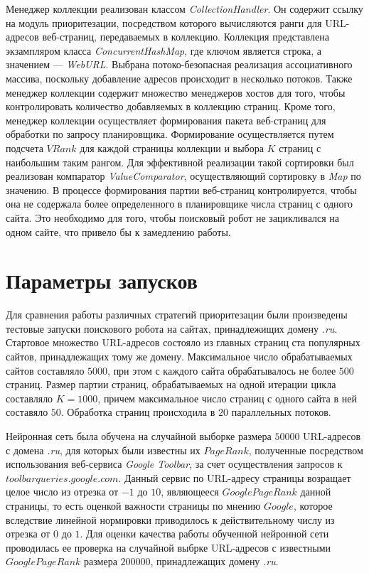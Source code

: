 Менеджер коллекции реализован классом \textit{CollectionHandler}. Он содержит ссылку на модуль приоритезации, посредством которого вычисляются ранги для URL-адресов веб-страниц, передаваемых в коллекцию. Коллекция представлена экзампляром класса \textit{ConcurrentHashMap}, где ключом является строка, а значением --- \textit{WebURL}. Выбрана потоко-безопасная реализация ассоциативного массива, поскольку добавление адресов происходит в несколько потоков. Также менеджер коллекции содержит множество менеджеров хостов для того, чтобы контролировать количество добавляемых в коллекцию страниц. Кроме того, менеджер коллекции осуществляет формирования пакета веб-страниц для обработки по запросу планировщика. Формирование осуществляется путем подсчета $VRank$ для каждой страницы коллекции и выбора $K$ страниц с наибольшим таким рангом. Для эффективной реализации такой сортировки был реализован компаратор \textit{ValueComparator}, осуществляющий сортировку в \textit{Map} по значению. В процессе формирования партии веб-страниц контролируется, чтобы она не содержала более определенного в планировщике числа страниц с одного сайта. Это необходимо для того, чтобы поисковый робот не зацикливался на одном сайте, что привело бы к замедлению работы.

\section{Параметры запусков}

Для сравнения работы различных стратегий приоритезации были произведены тестовые запуски поискового робота на сайтах, принадлежищих домену \textit{.ru}. Стартовое множество URL-адресов состояло из главных страниц ста популярных сайтов, принадлежащих тому же домену. 
Максимальное число обрабатываемых сайтов составляло $5000$, при этом с каждого сайта обрабатывалось не более $500$ страниц. Размер партии страниц, обрабатываемых на одной итерации цикла составляло $K = 1000$, причем максимальное число страниц с одного сайта в ней составяло $50$. Обработка страниц происходила в $20$ параллельных потоков.

Нейронная сеть была обучена на случайной выборке размера $50000$ URL-адресов с домена \textit{.ru}, для которых были известны их $PageRank$, полученные посредством использования веб-сервиса \textit{Google Toolbar}, за счет осуществления запросов к $toolbarqueries.google.com$. Данный сервис по URL-адресу страницы возращает целое число из отрезка от $-1$ до $10$, являющееся $Google PageRank$ данной страницы, то есть оценкой важности страницы по мнению $Google$, которое вследствие линейной нормировки приводилось к действительному числу из отрезка от $0$ до $1$. Для оценки качества работы обученной нейронной сети проводилась ее проверка на случайной выбрке URL-адресов с известными $Google PageRank$ размера $200000$, принадлежащих домену \textit{.ru}.

